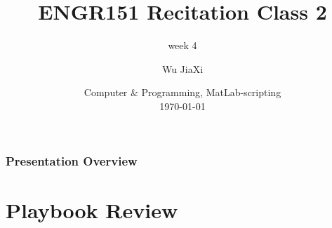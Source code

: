 \documentclass[
	11pt, %
]{beamer}
\title[Short Title]{ENGR151 Recitation Class 2} %
\subtitle{week 4} %
\author[James Cook \and Roald Amundsen]{Wu JiaXi} %
\institute[UC]{UM-SJTU joint institute \\ \smallskip \textit{nina$\_$nhk@sjtu.edu.cn}} %
\date[\today]{Computer $\&$ Programming, MatLab-scripting \\ \today} %
\begin{document}

\begin{frame}
	\titlepage %
\end{frame}



\begin{frame}
	\frametitle{Presentation Overview} %
	
	\tableofcontents %
\end{frame}


\section{Playbook Review} %
\end{document}
